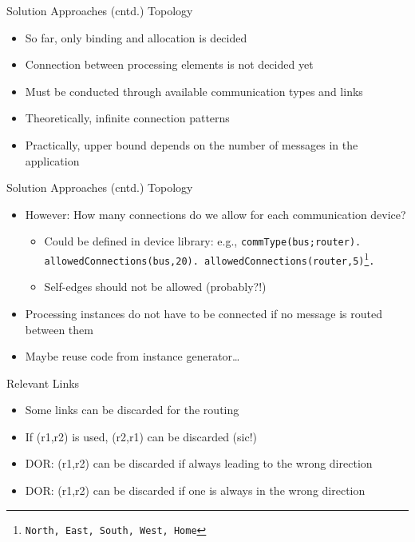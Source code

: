 \documentclass[11pt]{beamer}
\begin{document}
\begin{frame}{Solution Approaches (cntd.)}
  Topology
  \begin{itemize}
    \item So far, only binding and allocation is decided
    \item Connection between processing elements is not decided yet
    \item Must be conducted through available communication types and links
    \item Theoretically, infinite connection patterns
    \item Practically, upper bound depends on the number of messages in the application
  \end{itemize}
\end{frame}

\begin{frame}{Solution Approaches (cntd.)}
  Topology
  \begin{itemize}
  \item However: How many connections do we allow for each communication device?
    \begin{itemize}
      \item Could be defined in device library: e.g., \texttt{commType(bus;router). allowedConnections(bus,20). allowedConnections(router,5)\footnote{North, East, South, West, Home}.}
      \item Self-edges should not be allowed (probably?!)
    \end{itemize}
    \item Processing instances do not have to be connected if no message is routed between them
    \item Maybe reuse code from instance generator\ldots
  \end{itemize}
\end{frame}

\begin{frame}{Relevant Links}
  \begin{itemize}
    \item Some links can be discarded for the routing
    \item If (r1,r2) is used, (r2,r1) can be discarded (sic!)
    \item DOR: (r1,r2) can be discarded if always leading to the wrong direction
    \item DOR: (r1,r2) can be discarded if one is always in the wrong direction
  \end{itemize}
\end{frame}
\end{document}
